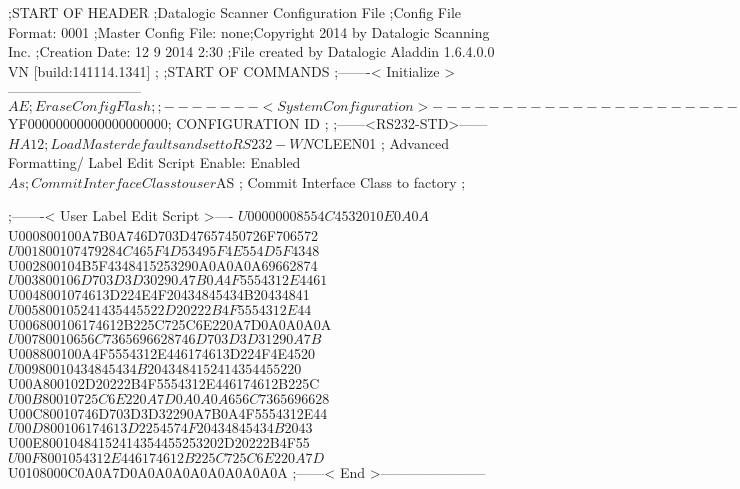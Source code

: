 ;START OF HEADER
;Datalogic Scanner Configuration File
;Config File Format: 0001
;Master Config File: none;Copyright 2014 by Datalogic Scanning Inc.
;Creation Date: 12 9 2014 2:30
;File created by Datalogic Aladdin 1.6.4.0.0 VN [build:141114.1341]
;
;START OF COMMANDS
;-------< Initialize >-----------------------------
$AE                 ; Erase Config Flash
;
;-------< System Configuration >-------------------------------
$YF00000000000000000000; CONFIGURATION ID
;
;------<RS232-STD>------
$HA12               ; Load Master defaults and set to RS232-WN
$CLEEN01            ; Advanced Formatting/ Label Edit Script Enable: Enabled
$As                 ; Commit Interface Class to user
$AS                 ; Commit Interface Class to factory
;

;-------< User Label Edit Script >----
$U00000008554C4532010E0A0A
$U000800100A7B0A746D703D47657450726F706572
$U001800107479284C465F4D53495F4E554D5F4348
$U002800104B5F4348415253290A0A0A0A69662874
$U003800106D703D3D30290A7B0A4F5554312E4461
$U0048001074613D224E4F20434845434B20434841
$U005800105241435445522D20222B4F5554312E44
$U006800106174612B225C725C6E220A7D0A0A0A0A
$U00780010656C7365696628746D703D3D31290A7B
$U008800100A4F5554312E446174613D224F4E4520
$U00980010434845434B2043484152414354455220
$U00A800102D20222B4F5554312E446174612B225C
$U00B80010725C6E220A7D0A0A0A656C7365696628
$U00C80010746D703D3D32290A7B0A4F5554312E44
$U00D800106174613D2254574F20434845434B2043
$U00E80010484152414354455253202D20222B4F55
$U00F8001054312E446174612B225C725C6E220A7D
$U0108000C0A0A7D0A0A0A0A0A0A0A0A0A
;------< End >-----------------------
